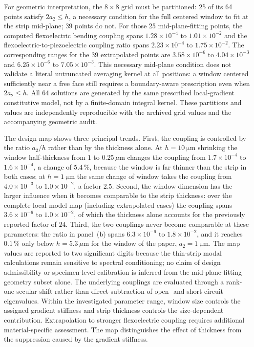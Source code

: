 For geometric interpretation, the $8\times8$ grid must be partitioned:
25 of its 64 points satisfy $2a_2\le h$, a necessary condition for the
full centered window to fit at the strip mid-plane; 39 points do not.
For those 25 mid-plane-fitting points, the computed flexoelectric bending
coupling spans $1.28\times10^{-4}$ to $1.01\times10^{-2}$ and the
flexoelectric-to-piezoelectric coupling ratio spans
$2.23\times10^{-4}$ to $1.75\times10^{-2}$. The corresponding ranges
for the 39 extrapolated points are $3.58\times10^{-6}$ to
$4.04\times10^{-3}$ and $6.25\times10^{-6}$ to $7.05\times10^{-3}$.
This necessary mid-plane condition does not validate a literal untruncated
averaging kernel at all positions: a window centered sufficiently near a
free face still requires a boundary-aware prescription even when $2a_2\le h$.
All 64 solutions are generated by the same prescribed local-gradient
constitutive model, not by a finite-domain integral kernel. These
partitions and values are independently reproducible with
the archived grid values and the accompanying geometric audit.

The design map shows three principal trends. First, the coupling is controlled by
the ratio $a_2/h$ rather than by the thickness alone. At
$h=\SI{10}{\micro\meter}$ shrinking the window half-thickness from $1$ to
$0.25\,\mu$m changes the coupling from $1.7\times10^{-4}$ to
$1.6\times10^{-4}$, a change of $5.4\,\%$, because the window is far thinner
than the strip in both cases; at $h=\SI{1}{\micro\meter}$ the same change of
window takes the coupling from $4.0\times10^{-3}$ to $1.0\times10^{-2}$, a
factor $2.5$. Second, the window dimension has the larger influence when it becomes
comparable to the strip thickness: over the complete local-model map (including extrapolated cases) the coupling spans
$3.6\times10^{-6}$ to $1.0\times10^{-2}$, of which the thickness alone
accounts for the previously reported factor of $24$. Third, the two
couplings never become comparable at these parameters: the ratio in panel~(b)
spans $6.3\times10^{-6}$ to $1.8\times10^{-2}$, and it reaches $0.1\,\%$ only
below $h=5.3\,\mu$m for the window of the paper, $a_2=\SI{1}{\micro\meter}$.
The map values are reported to two significant digits because the
thin-strip modal calculations remain sensitive to spectral conditioning;
no claim of design admissibility or specimen-level calibration is inferred
from the mid-plane-fitting geometry subset alone. The underlying
couplings are evaluated through a rank-one secular shift rather than direct
subtraction of open- and short-circuit eigenvalues.
Within the investigated parameter range, window size controls the
assigned gradient stiffness and strip thickness controls the size-dependent
contribution. Extrapolation to stronger flexoelectric coupling requires
additional material-specific assessment. The map distinguishes
the effect of thickness from the suppression caused by the gradient stiffness.

